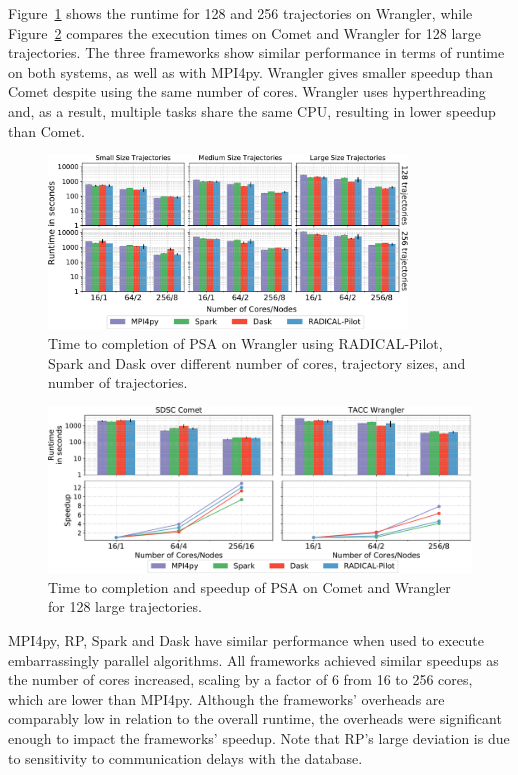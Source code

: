 Figure~\ref{fig:HausdorffWrangler} shows the runtime for 128 and 256
trajectories on Wrangler, while Figure~\ref{fig:comet_wrangler_haus} compares
the execution times on Comet and Wrangler for 128 large trajectories. The
three frameworks show similar performance in terms of runtime on both systems,
as well as with MPI4py. Wrangler gives smaller speedup than Comet
despite using the same number of cores. Wrangler uses hyperthreading and, as a
result, multiple tasks share the same CPU, resulting in lower speedup than
Comet.

\begin{figure}[t]
    \centering
    \includegraphics[width=0.85\textwidth]{figures/data_analytics_hpc/task_par/HausdorffSingleFig.pdf}
    \caption{Time to completion of PSA on Wrangler using RADICAL-Pilot, Spark
    and Dask over different number of cores, trajectory sizes, and number of
    trajectories.}
    \label{fig:HausdorffWrangler}
\end{figure}

\begin{figure}[t]
    \centering
    \includegraphics[width=.85\textwidth]{figures/data_analytics_hpc/task_par/comet_wrangler_haus.pdf}
    \caption{Time to completion and speedup of PSA on Comet and Wrangler for 128 large trajectories.}
    \label{fig:comet_wrangler_haus}
\end{figure}

MPI4py, RP, Spark and Dask have similar performance when used to
execute embarrassingly parallel algorithms. All frameworks achieved similar
speedups as the number of cores increased, scaling by a factor of 6 from 16 to
256 cores, which are lower than MPI4py. Although the frameworks' overheads are
comparably low in relation to the overall runtime, the overheads were significant
enough to impact the frameworks' speedup. Note that RP's large
deviation is due to sensitivity to communication delays with the database.

